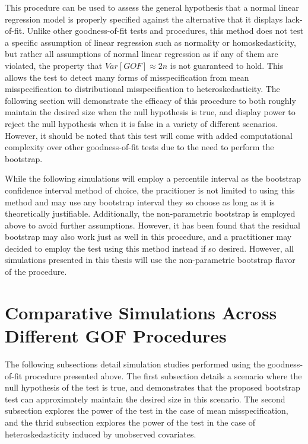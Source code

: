 		This procedure can be used to assess the general hypothesis that a normal linear regression model is properly specified against the alternative that it displays lack-of-fit.
		Unlike other goodness-of-fit tests and procedures, this method does not test a specific assumption of linear regression such as normality or homoskedasticity, but rather
		all assumptions of normal linear regression as if any of them are violated, the property that $Var[GOF] \approx 2n$ is not guaranteed to hold. This allows the test to detect
		many forms of misspecification from mean misspecification to distributional misspecification to heteroskedasticity. The following section will demonstrate the efficacy of
		this procedure to both roughly maintain the desired size when the null hypothesis is true, and display power to reject the null hypothesis when it is false in a variety of different
		scenarios. However, it should be noted that this test will come with added computational complexity over other goodness-of-fit tests due to the need to perform the bootstrap.
		
		While the following simulations will employ a percentile interval as the bootstrap confidence interval method of choice, the pracitioner is not limited to using this method
		and may use any bootstrap interval they so choose as long as it is theoretically justifiable. Additionally, the non-parametric bootstrap is employed above to avoid further
		assumptions. However, it has been found that the residual bootstrap may also work just as well in this procedure, and a practitioner may decided to employ the test
		using this method instead if so desired. However, all simulations presented in this thesis will use the non-parametric bootstrap flavor of the procedure.
		
		\section{Comparative Simulations Across Different GOF Procedures} \label{sec:gof_sim}

		The following subsections detail simulation studies performed using the goodness-of-fit procedure presented above. The first subsection details a scenario where the null
		hypothesis of the test is true, and demonstrates that the proposed bootstrap test can approximately maintain the desired size in this scenario. The second subsection 
		explores the power of the test in the case of mean misspecification, and the thrid subsection explores the power of the test in the case of heteroskedasticity induced by
		unobserved covariates.

